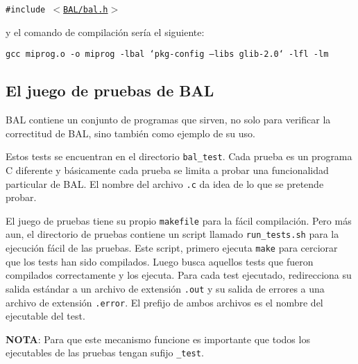 {\tt  \#include $<$\hyperlink{bal_8h}{BAL/bal.h}$>$ }

y el comando de compilación sería el siguiente:

{\tt  gcc miprog.o -o miprog -lbal `pkg-config --libs glib-2.0` -lfl -lm }\hypertarget{index_testsec}{}\subsection{El juego de pruebas de BAL}\label{index_testsec}
BAL contiene un conjunto de programas que sirven, no solo para verificar la correctitud de BAL, sino también como ejemplo de su uso.

Estos tests se encuentran en el directorio {\tt bal\_\-test}. Cada prueba es un programa C diferente y básicamente cada prueba se limita a probar una funcionalidad particular de BAL. El nombre del archivo {\tt .c} da idea de lo que se pretende probar.

El juego de pruebas tiene su propio {\tt makefile} para la fácil compilación. Pero más aun, el directorio de pruebas contiene un script llamado {\tt run\_\-tests.sh} para la ejecución fácil de las pruebas. Este script, primero ejecuta {\tt make} para cerciorar que los tests han sido compilados. Luego busca aquellos tests que fueron compilados correctamente y los ejecuta. Para cada test ejecutado, redirecciona su salida estándar a un archivo de extensión {\tt .out} y su salida de errores a una archivo de extensión {\tt .error}. El prefijo de ambos archivos es el nombre del ejecutable del test.

{\bf NOTA}: Para que este mecanismo funcione es importante que todos los ejecutables de las pruebas tengan sufijo {\tt \_\-test}.

